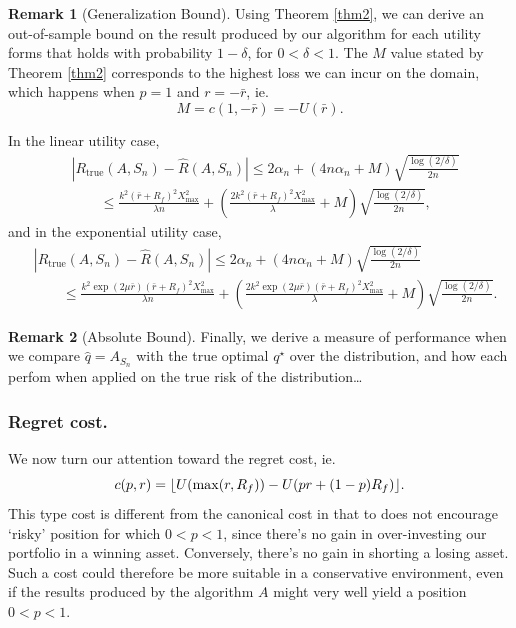 \documentclass[11pt]{article}
\DeclarePairedDelimiter\floor{\lfloor}{\rfloor}
\newcommand{\trueRisk}{R_{\mathrm{true}}}
\theoremstyle{plain}
\theoremstyle{definition}
\newtheorem*{rem}{Remark}
\begin{document}
\begin{rem}[Generalization Bound]
  Using Theorem \ref{thm2}, we can derive an out-of-sample bound on the result produced by
  our algorithm for each utility forms that holds with probability $1-\delta$, for
  $0<\delta<1$. The $M$ value stated by Theorem \ref{thm2} corresponds to the highest loss
  we can incur on the domain, which happens when $p=1$ and $r=-\bar r$, ie.
  \begin{equation}
    M = c(1,-\bar r) = -U(\bar r).
  \end{equation}

  In the linear utility case, 
  \begin{align}
    &|\trueRisk(A,S_n) - \hat{R}(A,S_n)| \leq 2\alpha_n + (4n\alpha_n +
      M)\sqrt{\frac{\log(2/\delta)}{2n}}\\
    &\qquad \leq \frac{k^2(\bar r+R_f)^2X^2_{\max}}{\lambda n} + \left(\frac{2k^2(\bar r+R_f)^2X^2_{\max}}{\lambda} + M\right)\sqrt{\frac{\log(2/\delta)}{2n}},
  \end{align}
  and in the exponential utility case, 
  \begin{align}
    &|\trueRisk(A,S_n) - \hat{R}(A,S_n)| \leq 2\alpha_n + (4n\alpha_n +
      M)\sqrt{\frac{\log(2/\delta)}{2n}}\\
    &\qquad \leq \frac{k^2 \exp(2\mu\bar r)(\bar r + R_f)^2 X^2_{\max}}{\lambda n} + \left(\frac{2k^2 \exp(2\mu\bar r)(\bar r + R_f)^2 X^2_{\max}}{\lambda} + M\right)\sqrt{\frac{\log(2/\delta)}{2n}}.
  \end{align}
\end{rem}

\begin{rem}[Absolute Bound]
  Finally, we derive a measure of performance when we compare $\hat q=A_{S_n}$ with the true
  optimal $q^\star$ over the distribution, and how each perfom when applied on the true
  risk of the distribution\ldots
\end{rem}

\subsubsection{Regret cost.}

We now turn our attention toward the regret cost, ie.
\begin{equation}
  c(p,r) = \floor{U(\max(r,R_f)) - U(pr + (1-p)R_f)}.
\end{equation}
This type cost is different from the canonical cost in that to does not encourage `risky'
position for which $0<p<1$, since there's no gain in over-investing our portfolio in a
winning asset. Conversely, there's no gain in shorting a losing asset. Such a cost could
therefore be more suitable in a conservative environment, even if the results produced by
the algorithm $A$ might very well yield a position $0<p<1$.
\end{document}
